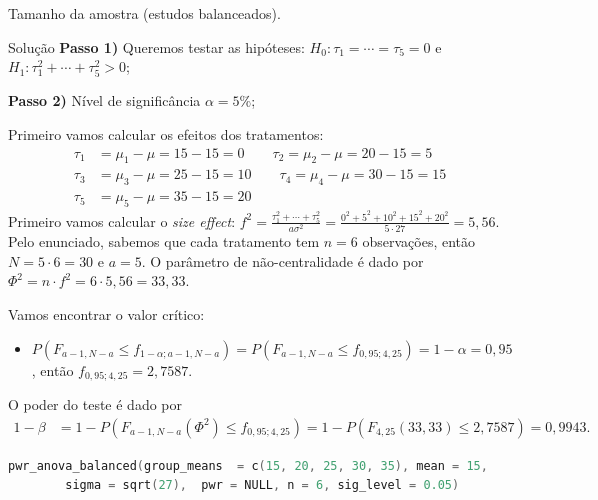 \documentclass[8pt]{beamer}
\begin{document}
\begin{frame}[fragile]{Tamanho da amostra (estudos balanceados).}

\small
\begin{block}{Solução}
	\textbf{Passo 1)} Queremos testar as hipóteses: $H_0: \tau_1 = \cdots = \tau_5 = 0$ e $H_1: \tau_1^2 + \cdots + \tau_5^2 > 0$;
	
	\textbf{Passo 2)} Nível de significância $\alpha=5\%$;
	
	Primeiro vamos calcular os efeitos dos tratamentos:
	\begin{align*}
	\tau_1 &= \mu_1 - \mu = 15 -15=0\qquad \tau_2 = \mu_2 - \mu = 20 -15=5\\
	\tau_3 &= \mu_3 - \mu = 25 -15=10\qquad \tau_4 = \mu_4 - \mu = 30 -15=15\\
	\tau_5 &= \mu_5 - \mu = 35 -15=20
	\end{align*}
	Primeiro vamos calcular o \textit{size effect}: $f^2 = \frac{\tau_1^2 + \cdots + \tau_5^2}{a\sigma^2} = \frac{0^2 + 5^2 + 10^2 + 15^2 + 20^2}{5 \cdot 27} = 5,56$. Pelo enunciado, sabemos que cada tratamento tem $n=6$ observações, então $N=5 \cdot 6 = 30$ e $a = 5$. O parâmetro de não-centralidade é dado por $\Phi^2 = n \cdot f^2 = 6 \cdot 5,56 = 33,33$. 
	
	Vamos encontrar o valor crítico:
	\begin{itemize}
		\item $P\left( F_{a-1, N-a} \leq f_{1-\alpha;a-1, N-a} \right) = P\left( F_{a-1, N-a} \leq f_{0,95;4, 25} \right) = 1-\alpha = 0,95$, então $f_{0,95;4, 25} = 2,7587$.
	\end{itemize}

	O poder do teste é dado por
	\begin{align*}
	1-\beta &=1 - P\left( F_{a-1, N-a}\left(\Phi^2\right) \leq  f_{0,95;4, 25} \right) = 1 - P\left( F_{4, 25}\left(33,33\right)  \leq 2,7587 \right) = 0,9943.
	\end{align*}
\end{block}

\begin{lstlisting}[language = C, caption = Código no R.]
pwr_anova_balanced(group_means  = c(15, 20, 25, 30, 35), mean = 15,
		sigma = sqrt(27),  pwr = NULL, n = 6, sig_level = 0.05)
\end{lstlisting}

\normalsize

\end{frame}
\end{document}
